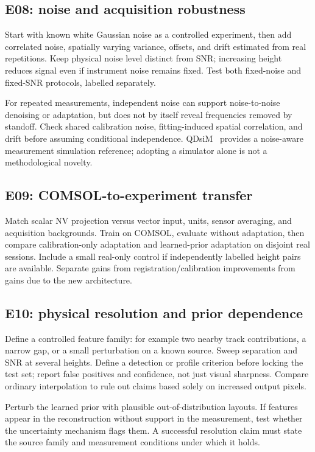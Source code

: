 \subsection{E08: noise and acquisition robustness}
Start with known white Gaussian noise as a controlled experiment, then add correlated noise, spatially varying variance, offsets, and drift estimated from real repetitions. Keep physical noise level distinct from SNR; increasing height reduces signal even if instrument noise remains fixed. Test both fixed-noise and fixed-SNR protocols, labelled separately.

For repeated measurements, independent noise can support noise-to-noise denoising or adaptation, but does not by itself reveal frequencies removed by standoff. Check shared calibration noise, fitting-induced spatial correlation, and drift before assuming conditional independence. QDsiM~\cite{qdsim} provides a noise-aware measurement simulation reference; adopting a simulator alone is not a methodological novelty.

\subsection{E09: COMSOL-to-experiment transfer}
Match scalar NV projection versus vector input, units, sensor averaging, and acquisition backgrounds. Train on COMSOL, evaluate without adaptation, then compare calibration-only adaptation and learned-prior adaptation on disjoint real sessions. Include a small real-only control if independently labelled height pairs are available. Separate gains from registration/calibration improvements from gains due to the new architecture.

\subsection{E10: physical resolution and prior dependence}
Define a controlled feature family: for example two nearby track contributions, a narrow gap, or a small perturbation on a known source. Sweep separation and SNR at several heights. Define a detection or profile criterion before locking the test set; report false positives and confidence, not just visual sharpness. Compare ordinary interpolation to rule out claims based solely on increased output pixels.

Perturb the learned prior with plausible out-of-distribution layouts. If features appear in the reconstruction without support in the measurement, test whether the uncertainty mechanism flags them. A successful resolution claim must state the source family and measurement conditions under which it holds.

